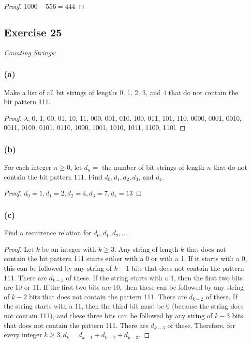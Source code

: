 \documentclass[14pt]{extarticle}
\begin{document}
\begin{proof}
     \(1000-556=444\)
\end{proof}

\subsection{Exercise 25}
{\it Counting Strings:}

\subsubsection{(a)}
Make a list of all bit strings of lengths 0, 1, 2, 3, and 4 that do not contain the bit pattern 111.

\begin{proof}
     \(\lambda\), 0, 1, 00, 01, 10, 11, 000, 001, 010, 100, 011, 101, 110, 0000, 0001, 0010, 0011, 0100, 0101, 0110, 1000, 1001, 1010, 1011, 1100, 1101
\end{proof}

\subsubsection{(b)}
For each integer \(n \geq 0\), let \(d_n =\) the number of bit strings of length $n$ that do not contain the bit
pattern 111. Find \(d_0, d_1, d_2, d_3\), and \(d_4\).

\begin{proof}
     \(d_0 = 1, d_1 = 2, d_2 = 4, d_3 = 7, d_4 = 13\)
\end{proof}

\subsubsection{(c)}
Find a recurrence relation for \(d_0, d_1, d_2, \ldots\).

\begin{proof}
     Let $k$ be an integer with \(k \geq 3\). Any string of length $k$ that does not contain the bit pattern 111 starts
     either with a 0 or with a 1. If it starts with a 0, this can be followed by any string of \(k - 1\) bits that does
     not contain the pattern 111. There are \(d_{k-1}\) of these. If the string starts with a 1, then the first two
     bits are 10 or 11. If the first two bits are 10, then these can be followed by any string of \(k - 2\) bits that does
     not contain the pattern 111. There are \(d_{k-2}\) of these. If the string starts with a 11, then the third bit
     must be 0 (because the string does not contain 111), and these three bits can be followed by any string of \(k - 3\)
     bits that does not contain the pattern 111. There are \(d_{k-3}\) of these. Therefore, for every integer
     \(k \geq 3, d_k = d_{k-1} + d_{k-2} + d_{k-3}\).
\end{proof}
\end{document}
